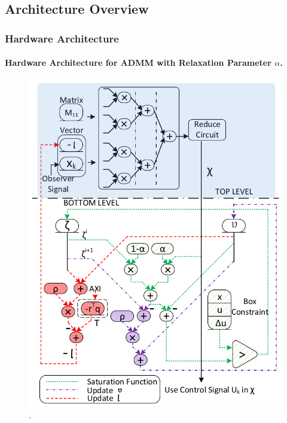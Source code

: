 \documentclass{beamer}
\begin{document}
\subsection{Architecture Overview}
\begin{frame}
\frametitle{Hardware Architecture}
\framesubtitle{Hardware Architecture for ADMM with Relaxation Parameter $\alpha$.\label{fig_arch}}
\begin{figure}[t]
\centering
\captionsetup{justification=centering}
\includegraphics[scale=.45]{../ASAP_17/figure/architecture.pdf}
\DeclareGraphicsExtensions.
\end{figure}

\end{frame}
\end{document}

